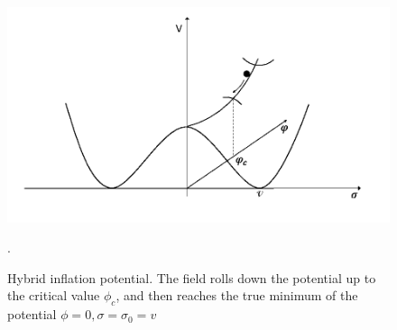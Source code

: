 \documentclass[11pt,a4paper,twoside]{book}
\begin{document}
 \begin{figure}
 	\centering
 	\includegraphics[width=0.55\linewidth, height=0.25\textheight]{Images/Chap2/HybridModel_GWFromInflation_Fig4}
 	\caption{Hybrid inflation potential. The field rolls down the potential up to the critical value $\phi_{c}$, and then reaches the true minimum of the potential $ \phi=0,\sigma=\sigma_{0}=v$ \cite{GWFromInflation:Intro}}
 	\label{fig:hybridmodelgwfrominflationfig4}.
 \end{figure}
 
\end{document}
